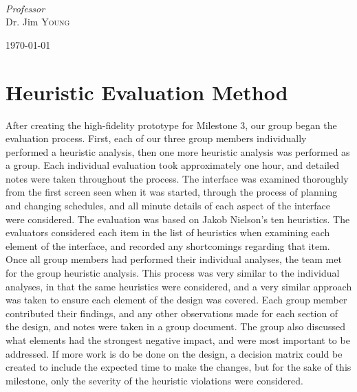 \documentclass{article}
\begin{document}
\begin{titlepage}
\begin{minipage}{0.4\textwidth}
\begin{flushleft}
		\end{flushleft}
	\end{minipage}
	~
	\begin{minipage}{0.4\textwidth}
		\begin{flushright}
			\large
			\textit{Professor}\\
			Dr. Jim \textsc{Young} %
		\end{flushright}
	\end{minipage}

	
	\vfill\vfill\vfill %
	
	{\large\today} %

	\vfill %
	
\end{titlepage}
\newpage

\section{Heuristic Evaluation Method}

After creating the high-fidelity prototype for Milestone 3, our group began the evaluation process. First, each of our three group members individually performed a heuristic analysis, then one more heuristic analysis was performed as a group. Each individual evaluation took approximately one hour, and detailed notes were taken throughout the process. The interface was examined thoroughly from the first screen seen when it was started, through the process of planning and changing schedules, and all minute details of each aspect of the interface were considered. The evaluation was based on Jakob Nielson's ten heuristics. The evaluators considered each item in the list of heuristics when examining each element of the interface, and recorded any shortcomings regarding that item.
\newline
\newline \noindent
Once all group members had performed their individual analyses, the team met for the group heuristic analysis. This process was very similar to the individual analyses, in that the same heuristics were considered, and a very similar approach was taken to ensure each element of the design was covered. Each group member contributed their findings, and any other observations made for each section of the design, and notes were taken in a group document. The group also discussed what elements had the strongest negative impact, and were most important to be addressed. If more work is do be done on the design, a decision matrix could be created to include the expected time to make the changes, but for the sake of this milestone, only the severity of the heuristic violations were considered.
\end{document}
